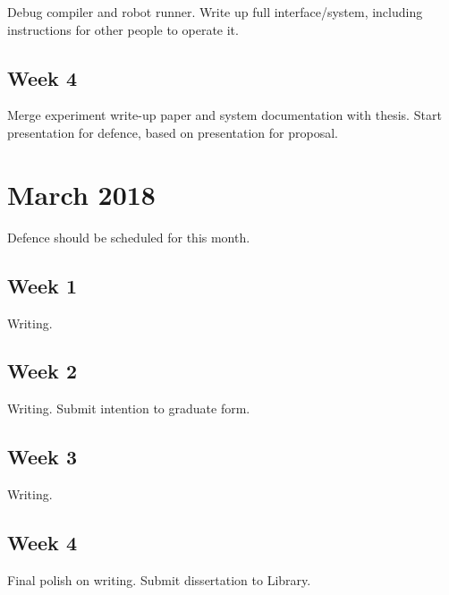 Debug compiler and robot runner. 
Write up full interface/system, including instructions for other people to operate it. 

\subsection{Week 4}

Merge experiment write-up paper and system documentation with thesis.
Start presentation for defence, based on presentation for proposal. 

\section{March 2018}

Defence should be scheduled for this month. 

\subsection{Week 1}

Writing.

\subsection{Week 2}

Writing.
Submit intention to graduate form. 

\subsection{Week 3}

Writing.

\subsection{Week 4}

Final polish on writing. 
Submit dissertation to Library. 

